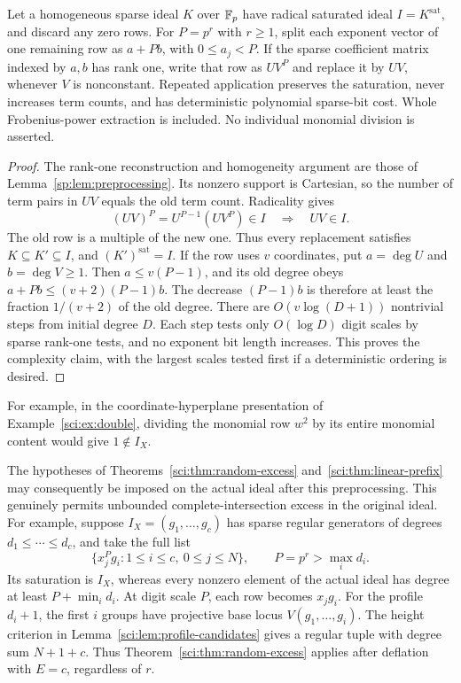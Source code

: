 \begin{lemma}
\label{sci:lem:deflation}
Let a homogeneous sparse ideal \(K\) over \(\mathbb F_p\) have radical
saturated ideal \(I=K^{\mathrm{sat}}\), and discard any zero rows.
For \(P=p^r\) with \(r\geq1\), split each exponent vector of one
remaining row as \(a+Pb\), with \(0\leq a_j<P\).
If the sparse coefficient matrix indexed by \(a,b\) has rank one,
write that row as \(UV^P\) and replace it by \(UV\), whenever
\(V\) is nonconstant. Repeated application preserves the saturation,
never increases term counts, and has deterministic polynomial sparse-bit
cost. Whole Frobenius-power extraction is included. No individual
monomial division is asserted.
\end{lemma}
\begin{proof}
The rank-one reconstruction and homogeneity argument are those of
Lemma~\ref{sp:lem:preprocessing}. Its nonzero support is Cartesian,
so the number of term pairs in \(UV\) equals the old term count.
Radicality gives
\[
 (UV)^P=U^{P-1}(UV^P)\in I\quad\Longrightarrow\quad UV\in I.
\]
The old row is a multiple of the new one. Thus every replacement
satisfies \(K\subseteq K'\subseteq I\), and \((K')^{\mathrm{sat}}=I\).
If the row uses \(v\) coordinates, put \(a=\deg U\) and
\(b=\deg V\geq1\). Then \(a\leq v(P-1)\), and its old degree
obeys \(a+Pb\leq(v+2)(P-1)b\). The decrease \((P-1)b\) is
therefore at least the fraction \(1/(v+2)\) of the old degree.
There are \(O(v\log(D+1))\) nontrivial steps from initial degree
\(D\). Each step tests only \(O(\log D)\) digit scales by sparse
rank-one tests, and no exponent bit length increases. This proves
the complexity claim, with the largest scales tested first if a
deterministic ordering is desired.
\end{proof}

For example, in the coordinate-hyperplane presentation of
Example~\ref{sci:ex:double}, dividing the monomial row \(w^2\) by
its entire monomial content would give \(1\notin I_X\).

The hypotheses of Theorems~\ref{sci:thm:random-excess}
and~\ref{sci:thm:linear-prefix} may consequently be imposed on the
actual ideal after this preprocessing. This genuinely permits
unbounded complete-intersection excess in the original ideal.
For example, suppose \(I_X=(g_1,\ldots,g_c)\) has sparse regular
generators of degrees \(d_1\leq\cdots\leq d_c\), and take the
full list
\[
 \{x_j^{P}g_i:1\leq i\leq c,\ 0\leq j\leq N\},
 \qquad P=p^r>\max_i d_i.
\]
Its saturation is \(I_X\), whereas every nonzero element of the
actual ideal has degree at least \(P+\min_i d_i\).
At digit scale \(P\), each row becomes \(x_jg_i\). For the profile
\(d_i+1\), the first \(i\) groups have projective base locus
\(V(g_1,\ldots,g_i)\). The height criterion in
Lemma~\ref{sci:lem:profile-candidates} gives a regular tuple with
degree sum \(N+1+c\). Thus Theorem~\ref{sci:thm:random-excess}
applies after deflation with \(E=c\), regardless of \(r\).

